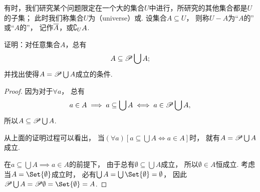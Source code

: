 有时，我们研究某个问题限定在一个大的集合\(U\)中进行，所研究的其他集合都是\(U\)的子集；
此时我们称集合\(U\)为（universe）或.
设集合\(A \subseteq U\)，
则称\(U-A\)为“\(A\)的”
或“\(A\)的”，
记作\(\SetComplementaryL{A}[U]\)，或\(\SetComplementaryC{A}[U]\).

\begin{example}
证明：对任意集合\(A\)，总有
\begin{equation}\label{equation:集合论.系的并的幂集包含系}
	A \subseteq \mathscr{P} \bigcup A;
\end{equation}
并找出使得\(A = \mathscr{P} \bigcup A\)成立的条件.
\begin{proof}
因为对于\(\forall a\)，
总有\begin{equation*}
	a \in A
	\implies
	a \subseteq \bigcup A
	\iff
	a \in \mathscr{P} \bigcup A,
\end{equation*}
所以\(A \subseteq \mathscr{P} \bigcup A\).

从上面的证明过程可以看出，
当\((\forall a)
[a \subseteq \bigcup A \iff a \in A]\)时，
就有\(A = \mathscr{P} \bigcup A\)成立.

在\(a \subseteq \bigcup A \implies a \in A\)的前提下，
由于总有\(\emptyset \subseteq \bigcup A\)成立，
所以\(\emptyset \in A\)恒成立.
考虑当\(A = \Set{\emptyset}\)成立时，
必有\(\bigcup A = \bigcup\Set{\emptyset} = \emptyset\)，
因此\(\Powerset \bigcup A = \Powerset \emptyset = \Set{\emptyset} = A\).
\end{proof}
\end{example}
